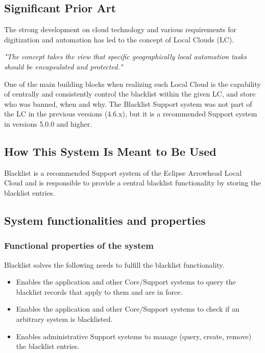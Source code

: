 \documentclass[a4paper]{arrowhead}
\begin{document}
\subsection{Significant Prior Art}
\label{sec:prior_art}

The strong development on cloud technology and various requirements for digitization and automation has led to the concept of Local Clouds (LC).

\textit{"The concept takes the view that specific geographically local automation tasks should be encapsulated and protected."} \cite{jerker2017localclouds}

One of the main building blocks when realizing such Local Cloud is the capability of centrally and consistently control the blacklist within the given LC, and store who was banned, when and why. The Blacklist Support system was not part of the LC in the previous versions (4.6.x), but it is a recommended Support system in versions 5.0.0 and higher.


\subsection{How This System Is Meant to Be Used}
\label{sec:use}

Blacklist is a recommended Support system of the Eclipse Arrowhead Local Cloud and is responsible to provide a central blacklist functionality by storing the blacklist entries.

\subsection{System functionalities and properties}
\label{sec:properties}

\subsubsection {Functional properties of the system}
Blacklist solves the following needs to fulfill the blacklist functionality.

\begin{itemize}
    \item Enables the application and other Core/Support systems to query the blacklist records that apply to them and are in force.
    \item Enables the application and other Core/Support systems to check if an arbitrary system is blacklisted.
    \item Enables administrative Support systems to manage (query, create, remove) the blacklist entries.
\end{itemize}
\end{document}
